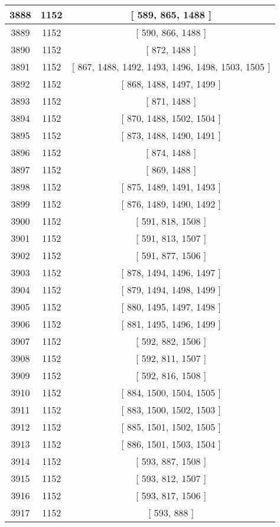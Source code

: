 \begin{center}
\begin{longtable}[H]{|| c c c ||}
\hline
3888 & 1152 & [ 589, 865, 1488 ] \\ 
\hline
3889 & 1152 & [ 590, 866, 1488 ] \\ 
\hline
3890 & 1152 & [ 872, 1488 ] \\ 
\hline
3891 & 1152 & [ 867, 1488, 1492, 1493, 1496, 1498, 1503, 1505 ] \\ 
\hline
3892 & 1152 & [ 868, 1488, 1497, 1499 ] \\ 
\hline
3893 & 1152 & [ 871, 1488 ] \\ 
\hline
3894 & 1152 & [ 870, 1488, 1502, 1504 ] \\ 
\hline
3895 & 1152 & [ 873, 1488, 1490, 1491 ] \\ 
\hline
3896 & 1152 & [ 874, 1488 ] \\ 
\hline
3897 & 1152 & [ 869, 1488 ] \\ 
\hline
3898 & 1152 & [ 875, 1489, 1491, 1493 ] \\ 
\hline
3899 & 1152 & [ 876, 1489, 1490, 1492 ] \\ 
\hline
3900 & 1152 & [ 591, 818, 1508 ] \\ 
\hline
3901 & 1152 & [ 591, 813, 1507 ] \\ 
\hline
3902 & 1152 & [ 591, 877, 1506 ] \\ 
\hline
3903 & 1152 & [ 878, 1494, 1496, 1497 ] \\ 
\hline
3904 & 1152 & [ 879, 1494, 1498, 1499 ] \\ 
\hline
3905 & 1152 & [ 880, 1495, 1497, 1498 ] \\ 
\hline
3906 & 1152 & [ 881, 1495, 1496, 1499 ] \\ 
\hline
3907 & 1152 & [ 592, 882, 1506 ] \\ 
\hline
3908 & 1152 & [ 592, 811, 1507 ] \\ 
\hline
3909 & 1152 & [ 592, 816, 1508 ] \\ 
\hline
3910 & 1152 & [ 884, 1500, 1504, 1505 ] \\ 
\hline
3911 & 1152 & [ 883, 1500, 1502, 1503 ] \\ 
\hline
3912 & 1152 & [ 885, 1501, 1502, 1505 ] \\ 
\hline
3913 & 1152 & [ 886, 1501, 1503, 1504 ] \\ 
\hline
3914 & 1152 & [ 593, 887, 1508 ] \\ 
\hline
3915 & 1152 & [ 593, 812, 1507 ] \\ 
\hline
3916 & 1152 & [ 593, 817, 1506 ] \\ 
\hline
3917 & 1152 & [ 593, 888 ] \\ 

\end{longtable}
\end{center}
